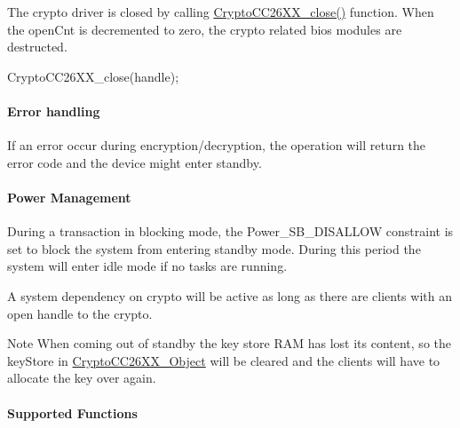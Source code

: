 The crypto driver is closed by calling \hyperlink{_crypto_c_c26_x_x_8h_aa2ece822f0fd8f6dbd3f50500b03bea4}{Crypto\+C\+C26\+X\+X\+\_\+close()} function. When the open\+Cnt is decremented to zero, the crypto related bios modules are destructed. 
\begin{DoxyCode}
CryptoCC26XX_close(handle);
\end{DoxyCode}


\paragraph*{Error handling}

If an error occur during encryption/decryption, the operation will return the error code and the device might enter standby.

\paragraph*{Power Management}

During a transaction in blocking mode, the Power\+\_\+\+S\+B\+\_\+\+D\+I\+S\+A\+L\+L\+O\+W constraint is set to block the system from entering standby mode. During this period the system will enter idle mode if no tasks are running.

A system dependency on crypto will be active as long as there are clients with an open handle to the crypto.

\begin{DoxyNote}{Note}
When coming out of standby the key store R\+A\+M has lost it\textquotesingle{}s content, so the key\+Store in \hyperlink{struct_crypto_c_c26_x_x___object}{Crypto\+C\+C26\+X\+X\+\_\+\+Object} will be cleared and the clients will have to allocate the key over again.
\end{DoxyNote}
\paragraph*{Supported Functions}

